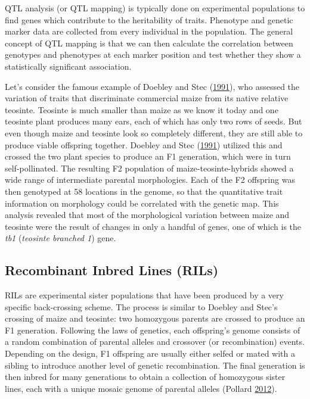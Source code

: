 \documentclass[12pt,]{book}
\theoremstyle{definition}
\theoremstyle{definition}
\theoremstyle{remark}
\begin{document}
QTL analysis (or QTL mapping) is typically done on experimental
populations to find genes which contribute to the heritability of
traits. Phenotype and genetic marker data are collected from every
individual in the population. The general concept of QTL mapping is that
we can then calculate the correlation between genotypes and phenotypes
at each marker position and test whether they show a statistically
significant association.

Let's consider the famous example of Doebley and Stec
(\protect\hyperlink{ref-Doebley285}{1991}), who assessed the variation
of traits that discriminate commercial maize from its native relative
teosinte. Teosinte is much smaller than maize as we know it today and
one teosinte plant produces many ears, each of which has only two rows
of seeds. But even though maize and teosinte look so completely
different, they are still able to produce viable offspring together.
Doebley and Stec (\protect\hyperlink{ref-Doebley285}{1991}) utilized
this and crossed the two plant species to produce an F1 generation,
which were in turn self-pollinated. The resulting F2 population of
maize-teosinte-hybrids showed a wide range of intermediate parental
morphologies. Each of the F2 offspring was then genotyped at 58
locations in the genome, so that the quantitative trait information on
morphology could be correlated with the genetic map. This analysis
revealed that most of the morphological variation between maize and
teosinte were the result of changes in only a handful of genes, one of
which is the \emph{tb1} (\emph{teosinte branched 1}) gene.

\subsection{Recombinant Inbred Lines
(RILs)}\label{recombinant-inbred-lines-rils}

RILs are experimental sister populations that have been produced by a
very specific back-crossing scheme. The process is similar to Doebley
and Stec's crossing of maize and teosinte: two homozygous parents are
crossed to produce an F1 generation. Following the laws of genetics,
each offspring's genome consists of a random combination of parental
alleles and crossover (or recombination) events. Depending on the
design, F1 offspring are usually either selfed or mated with a sibling
to introduce another level of genetic recombination. The final
generation is then inbred for many generations to obtain a collection of
homozygous sister lines, each with a unique mosaic genome of parental
alleles (Pollard \protect\hyperlink{ref-Pollard2012}{2012}).
\end{document}
